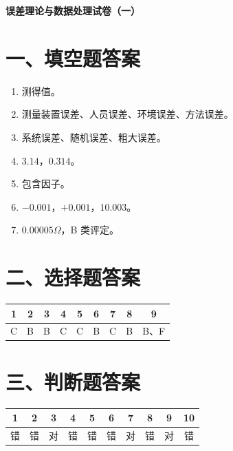 \documentclass[UTF8,12pt,a4paper]{ctexart}
\begin{document}
\begin{center}
    {\bfseries 误差理论与数据处理试卷（一）}\par
    \vspace{0.8em}
\end{center}
\vspace{0.6em}

\section*{一、填空题答案}
\begin{enumerate}[label=\arabic*、]
\item 测得值。
\item 测量装置误差、人员误差、环境误差、方法误差。
\item 系统误差、随机误差、粗大误差。
\item $3.14$，$0.314$。
\item 包含因子。
\item $-0.001$，$+0.001$，$10.003$。
\item $0.00005\Omega$，B 类评定。
\end{enumerate}

\section*{二、选择题答案}
\begin{center}
\begin{tabular}{ccccccccc}
\toprule
1&2&3&4&5&6&7&8&9\\
\midrule
C&B&B&C&C&B&C&B&B、F\\
\bottomrule
\end{tabular}
\end{center}

\section*{三、判断题答案}
\begin{center}
\begin{tabular}{cccccccccc}
\toprule
1&2&3&4&5&6&7&8&9&10\\
\midrule
错&错&对&错&错&错&对&错&对&错\\
\bottomrule
\end{tabular}
\end{center}

\newpage
\end{document}
